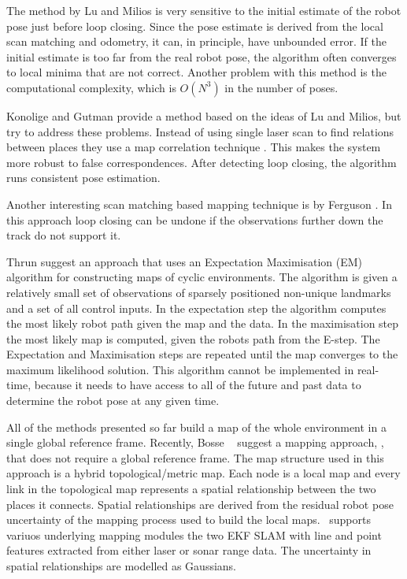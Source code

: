 The method by Lu and Milios is very sensitive to the initial estimate
of the robot pose just before loop closing. Since the pose estimate is
derived from the local scan matching and odometry, it can, in
principle, have unbounded error. If the initial estimate is too far
from the real robot pose, the algorithm often converges to local
minima that are not correct. Another problem with this method is the
computational complexity, which is $O(N^3)$ in the number of poses.

Konolige and Gutman
\cite{konolige99:_increm_mappin_large_cyclic_envir} provide a method
based on the ideas of Lu and Milios, but try to address these
problems. Instead of using single laser scan to find relations between
places they use a map correlation technique \cite{konolige99}. This
makes the system more robust to false correspondences. After detecting
loop closing, the algorithm runs consistent pose estimation. 

Another interesting scan matching based mapping technique is
\cite{fergusson2003} by Ferguson \etal. In this approach loop closing
can be undone if the observations further down the track do not
support it.

Thrun \etal \cite{slam_thrun98b,Thrun98a,thrun98:_probab} suggest an
approach that uses an Expectation Maximisation (EM) algorithm for
constructing maps of cyclic environments. The algorithm is given a
relatively small set of observations of sparsely positioned non-unique
landmarks and a set of all control inputs. In the expectation step the
algorithm computes the most likely robot path given the map and the
data. In the maximisation step the most likely map is computed, given
the robots path from the E-step. The Expectation and Maximisation
steps are repeated until the map converges to the maximum likelihood
solution. This algorithm cannot be implemented in real-time, because
it needs to have access to all of the future and past data to
determine the robot pose at any given time.

All of the methods presented so far build a map of the whole
environment in a single global reference frame. Recently, Bosse \etal\
\cite{bosse03atlas} suggest a mapping approach, \Atlas, that does not
require a global reference frame. The map structure used in this
approach is a hybrid topological/metric map.  Each node is a local map
and every link in the topological map represents a spatial
relationship between the two places it connects.  Spatial
relationships are derived from the residual robot pose uncertainty of
the mapping process used to build the local maps. \Atlas\ supports variuos 
underlying mapping modules the two EKF SLAM with line and point features extracted from
either laser or sonar range data. The uncertainty in spatial
relationships are modelled as Gaussians.

